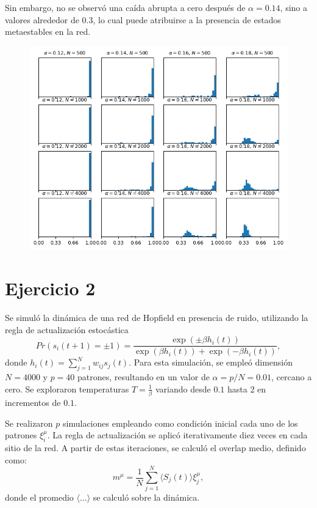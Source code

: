 \documentclass[aps,prb,twocolumn,superscriptaddress,floatfix,longbibliography]{revtex4-2}
\begin{document}
Sin embargo, no se observó una caída abrupta a cero después de \( \alpha = 0.14 \), sino a valores alrededor de $0.3$, lo cual puede atribuirse a la presencia de estados metaestables en la red.


\begin{figure}[h]
  \includegraphics[clip=true,width=\columnwidth]{../ej1_histograma.png}
  \caption{}
   \label{fig:ej1_histograma}
\end{figure}

\section*{Ejercicio 2}

Se simuló la dinámica de una red de Hopfield en presencia de ruido, utilizando la regla de actualización estocástica
\[ Pr(s_i(t + 1) = \pm1) = \frac{\exp(\pm\beta h_i(t))}{\exp(\beta h_i(t)) + \exp(-\beta h_i(t))}, \]
donde \( h_i(t) = \sum_{j=1}^{N} w_{ij}s_j(t) \). Para esta simulación, se empleó dimensión \( N = 4000 \) y \( p = 40 \) patrones, resultando en un valor de \( \alpha = p/N = 0.01 \), cercano a cero. Se exploraron temperaturas \( T = \frac{1}{\beta} \) variando desde $0.1$ hasta $2$ en incrementos de $0.1$.

Se realizaron $p$ simulaciones empleando como condición inicial cada uno de los patrones \( \xi_i^\mu \). La regla de actualización se aplicó iterativamente diez veces en cada sitio de la red. A partir de estas iteraciones, se calculó el overlap medio, definido como:
\[ m^\mu = \frac{1}{N} \sum_{j=1}^{N} \langle S_j(t) \rangle \xi_j^\mu, \]
donde el promedio \( \langle \ldots \rangle \) se calculó sobre la dinámica.
\end{document}
